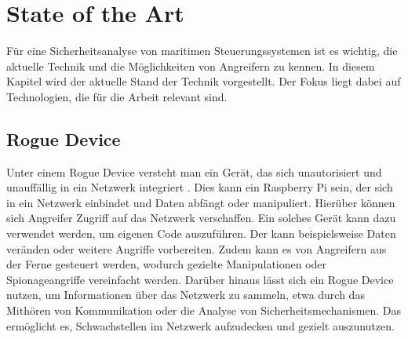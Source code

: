 \chapter{State of the Art}

Für eine Sicherheitsanalyse von maritimen Steuerungssystemen ist es wichtig, die aktuelle Technik und die
Möglichkeiten von Angreifern zu kennen. In diesem Kapitel wird der aktuelle Stand der Technik vorgestellt.
Der Fokus liegt dabei auf Technologien, die für die Arbeit relevant sind.

\section{Rogue Device}
Unter einem Rogue Device versteht man ein Gerät, das sich unautorisiert und unauffällig in ein Netzwerk integriert \cite{Scarfone2008}.
Dies kann ein Raspberry Pi sein, der sich in ein Netzwerk einbindet und Daten abfängt oder manipuliert. Hierüber können 
sich Angreifer Zugriff auf das Netzwerk verschaffen. 
Ein solches Gerät kann dazu verwendet werden, um eigenen Code auszuführen. Der kann beispielsweise Daten veränden oder 
weitere Angriffe vorbereiten. Zudem kann es von Angreifern aus der Ferne gesteuert werden, wodurch gezielte 
Manipulationen oder Spionageangriffe vereinfacht werden. Darüber hinaus lässt sich ein Rogue Device nutzen, um Informationen 
über das Netzwerk zu sammeln, etwa durch das Mithören von Kommunikation oder die Analyse von Sicherheitsmechanismen.
Das ermöglicht es, Schwachstellen im Netzwerk aufzudecken und gezielt auszunutzen.

